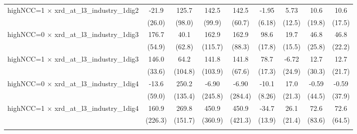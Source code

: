 {\begin{tabular}{l*{8}{c}}
\addlinespace
highNCC=1 $\times$ xrd\_at\_l3\_industry\_1dig2&       -21.9         &       125.7         &       142.5         &       142.5\sym{**} &       -1.95         &        5.73         &        10.6         &        10.6         \\
                    &      (26.0)         &      (98.0)         &      (99.9)         &      (60.7)         &      (6.18)         &      (12.5)         &      (19.8)         &      (17.5)         \\
\addlinespace
highNCC=0 $\times$ xrd\_at\_l3\_industry\_1dig3&       176.7\sym{***}&        40.1         &       162.9         &       162.9\sym{*}  &        98.6\sym{***}&        19.7         &        46.8\sym{*}  &        46.8\sym{**} \\
                    &      (54.9)         &      (62.8)         &     (115.7)         &      (88.3)         &      (17.8)         &      (15.5)         &      (25.8)         &      (22.2)         \\
\addlinespace
highNCC=1 $\times$ xrd\_at\_l3\_industry\_1dig3&       146.0\sym{***}&        64.2         &       141.8         &       141.8\sym{**} &        78.7\sym{***}&       -6.72         &        12.7         &        12.7         \\
                    &      (33.6)         &     (104.8)         &     (103.9)         &      (67.6)         &      (17.3)         &      (24.9)         &      (30.3)         &      (21.7)         \\
\addlinespace
highNCC=0 $\times$ xrd\_at\_l3\_industry\_1dig4&       -13.6         &       250.2\sym{*}  &       -6.90         &       -6.90         &       -10.1         &        17.0         &       -0.59         &       -0.59         \\
                    &      (59.0)         &     (135.4)         &     (245.8)         &     (284.4)         &      (8.26)         &      (21.3)         &      (44.5)         &      (37.9)         \\
\addlinespace
highNCC=1 $\times$ xrd\_at\_l3\_industry\_1dig4&       160.9         &       269.8\sym{*}  &       450.9         &       450.9         &       -34.7\sym{**} &        26.1         &        72.6         &        72.6         \\
                    &     (226.3)         &     (151.7)         &     (360.9)         &     (421.3)         &      (13.9)         &      (21.4)         &      (83.6)         &      (64.5)         \\
\addlinespace

\end{tabular}}
